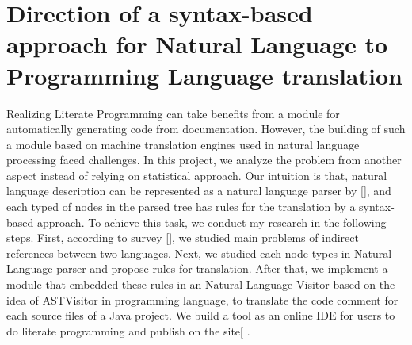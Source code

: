 \section{Direction of  a syntax-based approach for Natural Language to Programming Language translation}
Realizing Literate Programming can take benefits from a module for automatically generating code from documentation. However, the building of such a module based on machine translation engines used in natural language processing faced challenges. In this project, we analyze the problem from another aspect instead of relying on statistical approach. Our intuition is that, natural language description can be represented as a natural language parser by [\cite{P13-1045}], and each typed of nodes in the parsed tree has rules for the translation by a syntax-based approach. To achieve this task, we conduct my research in the following steps.  First, according to survey [\cite{Pulido-Prieto:2017:SNP:3145473.3109481}], we studied main problems of indirect references between two languages. Next, we studied each node types in Natural Language parser and propose rules for translation. After that, we implement a module that embedded these rules in an Natural Language Visitor based on the idea of ASTVisitor in programming language, to translate the code comment for each source files of a Java project. We build a tool as an online IDE for users to do literate programming and publish on the site[ \cite{NLPLWebTool}. 









